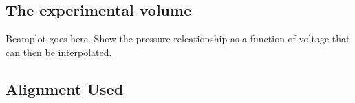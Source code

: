 

\subsection{The experimental volume}

Beamplot goes here.
Show the pressure releationship as a function of voltage that can then be interpolated.






\subsection{Alignment Used}





